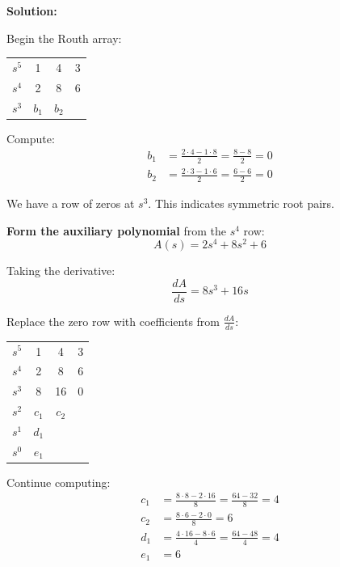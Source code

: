 \textbf{Solution:}

Begin the Routh array:
\begin{center}
\begin{tabular}{c|ccc}
\toprule
$s^5$ & 1 & 4 & 3 \\
$s^4$ & 2 & 8 & 6 \\
$s^3$ & $b_1$ & $b_2$ & \\
\bottomrule
\end{tabular}
\end{center}

Compute:
\begin{align*}
b_1 &= \frac{2 \cdot 4 - 1 \cdot 8}{2} = \frac{8-8}{2} = 0 \\
b_2 &= \frac{2 \cdot 3 - 1 \cdot 6}{2} = \frac{6-6}{2} = 0
\end{align*}

We have a row of zeros at $s^3$. This indicates symmetric root pairs.

\textbf{Form the auxiliary polynomial} from the $s^4$ row:
\begin{equation*}
A(s) = 2s^4 + 8s^2 + 6
\end{equation*}

Taking the derivative:
\begin{equation*}
\frac{dA}{ds} = 8s^3 + 16s
\end{equation*}

Replace the zero row with coefficients from $\frac{dA}{ds}$:
\begin{center}
\begin{tabular}{c|ccc}
\toprule
$s^5$ & 1 & 4 & 3 \\
$s^4$ & 2 & 8 & 6 \\
$s^3$ & 8 & 16 & 0 \\
$s^2$ & $c_1$ & $c_2$ & \\
$s^1$ & $d_1$ & & \\
$s^0$ & $e_1$ & & \\
\bottomrule
\end{tabular}
\end{center}

Continue computing:
\begin{align*}
c_1 &= \frac{8 \cdot 8 - 2 \cdot 16}{8} = \frac{64-32}{8} = 4 \\
c_2 &= \frac{8 \cdot 6 - 2 \cdot 0}{8} = 6 \\
d_1 &= \frac{4 \cdot 16 - 8 \cdot 6}{4} = \frac{64-48}{4} = 4 \\
e_1 &= 6
\end{align*}

